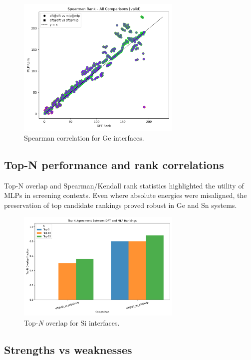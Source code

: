 \begin{figure}[h]
    \centering
    \includegraphics[width=0.7\textwidth]{analysis/plots/results_lower_Ge_spearman_all_comparisons_valid.png}
    \caption{Spearman correlation for Ge interfaces.}
\end{figure}

\subsection{Top-N performance and rank correlations}

Top-N overlap and Spearman/Kendall rank statistics highlighted the utility of MLPs in screening contexts. Even where absolute energies were misaligned, the preservation of top candidate rankings proved robust in Ge and Sn systems.

\begin{figure}[h]
    \centering
    \includegraphics[width=0.7\textwidth]{analysis/plots/results_lower_Si_topn_overlap.png}
    \caption{Top-\textit{N} overlap for Si interfaces.}
\end{figure}

\subsection{Strengths vs weaknesses}

